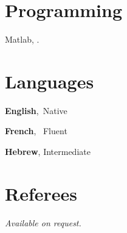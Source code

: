 \documentclass[margin,line]{resume}
\begin{document}
\begin{resume}





    \section{\mysidestyle Programming} 

Matlab, \LaTeXe.
%
    \section{\mysidestyle Languages} 
       \textbf{English}, \qquad \,Native \hfill

\vspace{-2mm}
       \textbf{French}, \qquad \, Fluent \hfill

\vspace{-2mm}
 \textbf{Hebrew}, \qquad Intermediate \hfill
    \section{\mysidestyle Referees} 
    {\sl Available on request.}



%
%


\end{resume}
\end{document}
